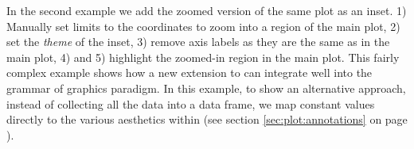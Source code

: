 \documentclass[krantz2]{krantz}\usepackage{knitr}
\begin{document}
In the second example we add the zoomed version of the same plot as an inset. 1) Manually set limits to the coordinates to zoom into a region of the main plot, 2) set the \emph{theme} of the inset, 3) remove axis labels as they are the same as in the main plot, 4) and 5) highlight the zoomed-in region in the main plot. This fairly complex example shows how a new extension to  can integrate well into the grammar of graphics paradigm. In this example, to show an alternative approach, instead of collecting all the data into a data frame, we map constant values directly to the various aesthetics within  (see section \ref{sec:plot:annotations} on page \pageref{sec:plot:annotations}).

\begin{knitrout}\footnotesize
{}\color{fgcolor}\begin{kframe}
\begin{alltt}
 \hlkwb{<-} \hlstd{(}  \hlstd{(}     \hlstd{=}  \hlopt{+}
  \hlstd{()}
 \hlkwb{<-}  \hlopt{+}
  \hlstd{(} \hlstd{=} \hlstd{(}\hlstd{,} \hlstd{),}  \hlstd{=} \hlstd{(}\hlstd{,} \hlstd{))} \hlopt{+}
  \hlstd{(} \hlstd{=} \hlstd{,}  \hlstd{=} \hlstd{)} \hlopt{+}
  \hlstd{(} \hlstd{=} \hlstd{)} \hlopt{+}
  \hlstd{(}\hlstd{)} \hlopt{+} \hlstd{(} \hlstd{=} \hlstd{)}
 \hlopt{+}
  \hlstd{(} \hlstd{=} \hlstd{,}  \hlstd{=} \hlstd{,}  \hlstd{=}   \hlstd{=} \hlopt{/}\hlstd{,}
             \hlstd{=} \hlstd{,}  \hlstd{=} \hlstd{)} \hlopt{+}
  \hlstd{(} \hlstd{=} \hlstd{,}  \hlstd{=} \hlstd{,}  \hlstd{=} \hlstd{,}
            \hlstd{=} \hlstd{,}  \hlstd{=} \hlstd{,}  \hlstd{=} \hlstd{,}  \hlstd{=} \hlstd{,}
            \hlstd{=} \hlstd{)}
\end{alltt}
\end{kframe}


\end{knitrout}
\end{document}
